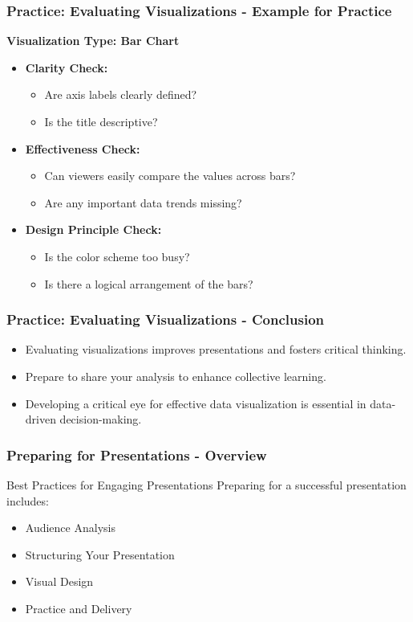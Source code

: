 \documentclass[aspectratio=169]{beamer}
\begin{document}
\begin{frame}[fragile]
    \frametitle{Practice: Evaluating Visualizations - Example for Practice}
    \textbf{Visualization Type: Bar Chart}
    \begin{itemize}
        \item \textbf{Clarity Check:} 
            \begin{itemize}
                \item Are axis labels clearly defined?
                \item Is the title descriptive?
            \end{itemize}
        \item \textbf{Effectiveness Check:}
            \begin{itemize}
                \item Can viewers easily compare the values across bars?
                \item Are any important data trends missing?
            \end{itemize}
        \item \textbf{Design Principle Check:}
            \begin{itemize}
                \item Is the color scheme too busy?
                \item Is there a logical arrangement of the bars?
            \end{itemize}
    \end{itemize}
\end{frame}

\begin{frame}[fragile]
    \frametitle{Practice: Evaluating Visualizations - Conclusion}
    \begin{itemize}
        \item Evaluating visualizations improves presentations and fosters critical thinking.
        \item Prepare to share your analysis to enhance collective learning.
        \item Developing a critical eye for effective data visualization is essential in data-driven decision-making.
    \end{itemize}
\end{frame}

\begin{frame}[fragile]
    \frametitle{Preparing for Presentations - Overview}
    \begin{block}{Best Practices for Engaging Presentations}
        Preparing for a successful presentation includes:
        \begin{itemize}
            \item Audience Analysis
            \item Structuring Your Presentation
            \item Visual Design
            \item Practice and Delivery
        \end{itemize}
    \end{block}
\end{frame}
\end{document}
